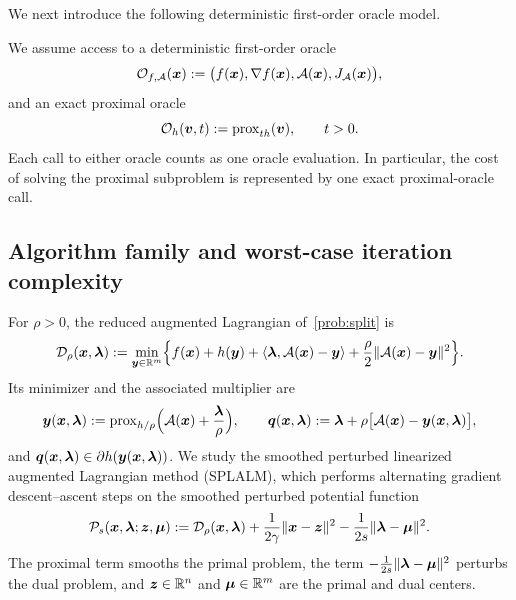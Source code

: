 We next introduce the following deterministic first-order oracle model.
\begin{definition}
\label{def:oracle-model}
We assume access to a deterministic first-order oracle
\[
    \mathcal{O}_{f,\mathcal{A}}(\bm{x})
    :=
    \bigl(f(\bm{x}),\nabla f(\bm{x}),\mathcal{A}(\bm{x}),J_{\mathcal{A}}(\bm{x})\bigr),
\]
and an exact proximal oracle
\[
    \mathcal{O}_{h}(\bm{v},t)
    :=
    \operatorname{prox}_{t h}(\bm{v}),
    \qquad t>0.
\]
Each call to either oracle counts as one oracle evaluation. In particular,
the cost of solving the proximal subproblem is represented by one exact
proximal-oracle call.
\end{definition}

\subsection{Algorithm family and worst-case iteration complexity}
\label{subsec:algorithm-family}

For \(\rho>0\), the reduced augmented Lagrangian of~\eqref{prob:split} is
\begin{equation}
    \mathcal{D}_\rho(\bm{x},\bm{\lambda})
    :=\min_{\bm{y}\in\mathbb{R}^m}\Bigl\{f(\bm{x})+h(\bm{y})+\langle\bm{\lambda},\mathcal{A}(\bm{x})-\bm{y}\rangle
    +\frac{\rho}{2}\|\mathcal{A}(\bm{x})-\bm{y}\|^2\Bigr\}.
    \label{eq:reduced-al}
\end{equation}
Its minimizer and the associated multiplier are
\begin{equation}
    \bm{y}(\bm{x},\bm{\lambda}):=\mathrm{prox}_{h/\rho}\Bigl(\mathcal{A}(\bm{x})+\frac{\bm{\lambda}}{\rho}\Bigr),
    \qquad
    \bm{q}(\bm{x},\bm{\lambda}):=\bm{\lambda}+\rho\bigl[\mathcal{A}(\bm{x})-\bm{y}(\bm{x},\bm{\lambda})\bigr],
    \label{eq:prox-multiplier}
\end{equation}
and \(\bm{q}(\bm{x},\bm{\lambda})\in\partial h(\bm{y}(\bm{x},\bm{\lambda}))\).
We study the smoothed perturbed linearized augmented Lagrangian method
(SPLALM), which performs alternating gradient descent--ascent steps on the
smoothed perturbed potential function
\begin{equation}
    \mathcal P_s(\bm{x},\bm{\lambda};\bm{z},\bm{\mu})
    :=\mathcal{D}_\rho(\bm{x},\bm{\lambda})+\frac{1}{2\gamma}\|\bm{x}-\bm{z}\|^2
    -\frac{1}{2s}\|\bm{\lambda}-\bm{\mu}\|^2 .
    \label{eq:potential}
\end{equation}
The proximal term smooths the primal problem, the term
\(-\frac{1}{2s}\|\bm{\lambda}-\bm{\mu}\|^2\) perturbs the dual problem, and
\(\bm{z}\in\mathbb{R}^n\) and \(\bm{\mu}\in\mathbb{R}^m\) are the primal and dual centers.


